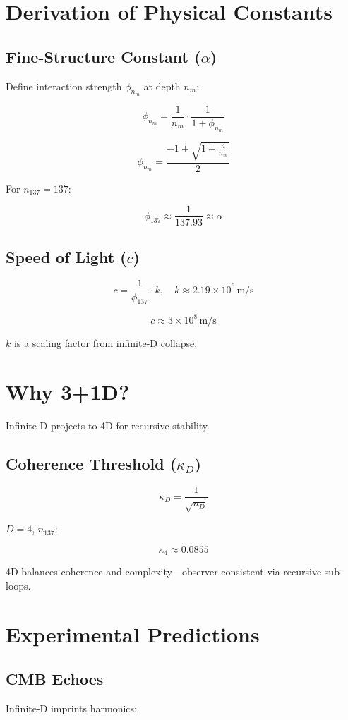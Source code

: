 \documentclass[12pt]{article}
\begin{document}
\section{Derivation of Physical Constants}

\subsection{Fine-Structure Constant (\(\alpha\))}
Define interaction strength \(\phi_{n_m}\) at depth \(n_m\):

\[
\phi_{n_m} = \frac{1}{n_m} \cdot \frac{1}{1 + \phi_{n_m}}
\]

\[
\phi_{n_m} = \frac{-1 + \sqrt{1 + \frac{4}{n_m}}}{2}
\]

For \(n_{137} = 137\):

\[
\phi_{137} \approx \frac{1}{137.93} \approx \alpha
\]

\subsection{Speed of Light (\(c\))}
\[
c = \frac{1}{\phi_{137}} \cdot k, \quad k \approx 2.19 \times 10^6 \, \text{m/s}
\]

\[
c \approx 3 \times 10^8 \, \text{m/s}
\]

\(k\) is a scaling factor from infinite-D collapse.

\section{Why 3+1D?}

Infinite-D projects to 4D for recursive stability.

\subsection{Coherence Threshold (\(\kappa_D\))}
\[
\kappa_D = \frac{1}{\sqrt{n_D}}
\]

\(D = 4\), \(n_{137}\):

\[
\kappa_4 \approx 0.0855
\]

4D balances coherence and complexity—observer-consistent via recursive sub-loops.

\section{Experimental Predictions}

\subsection{CMB Echoes}
Infinite-D imprints harmonics:
\end{document}
